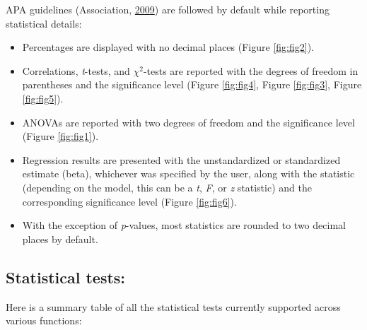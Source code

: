 \documentclass[
]{article}
\providecommand{\tightlist}{%
  \setlength{\itemsep}{0pt}\setlength{\parskip}{0pt}}
\begin{document}
APA guidelines (Association, \protect\hyperlink{ref-associationPublicationManualAmerican2009}{2009}) are followed by
default while reporting statistical details:

\begin{itemize}
\tightlist
\item
  Percentages are displayed with no decimal places (Figure \ref{fig:fig2}).
\item
  Correlations, \emph{t}-tests, and \(\chi^2\)-tests are reported with the degrees
  of freedom in parentheses and the significance level (Figure \ref{fig:fig4},
  Figure \ref{fig:fig3}, Figure \ref{fig:fig5}).
\item
  ANOVAs are reported with two degrees of freedom and the significance level
  (Figure \ref{fig:fig1}).
\item
  Regression results are presented with the unstandardized or standardized
  estimate (beta), whichever was specified by the user, along with the
  statistic (depending on the model, this can be a \emph{t}, \emph{F}, or \emph{z} statistic)
  and the corresponding significance level (Figure \ref{fig:fig6}).
\item
  With the exception of \emph{p}-values, most statistics are rounded to two decimal
  places by default.
\end{itemize}

\hypertarget{statistical-tests}{%
\subsection{Statistical tests:}\label{statistical-tests}}

Here is a summary table of all the statistical tests currently supported across
various functions:
\end{document}
